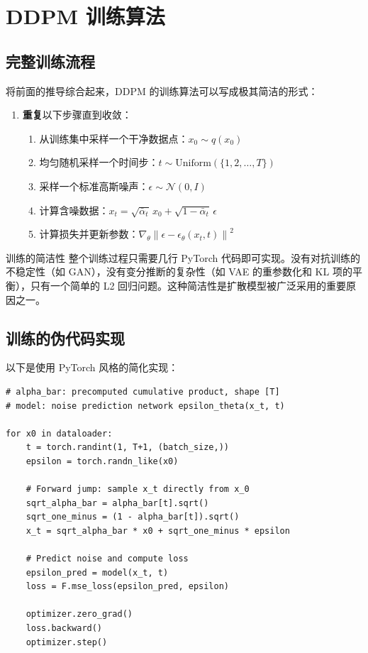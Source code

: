 \section{DDPM 训练算法}

\subsection{完整训练流程}

将前面的推导综合起来，DDPM 的训练算法可以写成极其简洁的形式：

\begin{enumerate}
    \item \textbf{重复}以下步骤直到收敛：
    \begin{enumerate}
        \item 从训练集中采样一个干净数据点：$x_0 \sim q(x_0)$
        \item 均匀随机采样一个时间步：$t \sim \text{Uniform}(\{1, 2, \dots, T\})$
        \item 采样一个标准高斯噪声：$\epsilon \sim \mathcal{N}(0, I)$
        \item 计算含噪数据：$x_t = \sqrt{\bar{\alpha}_t}\, x_0 + \sqrt{1 - \bar{\alpha}_t}\, \epsilon$
        \item 计算损失并更新参数：$\nabla_\theta \left\| \epsilon - \epsilon_\theta(x_t, t) \right\|^2$
    \end{enumerate}
\end{enumerate}

\begin{knowledgebox}{训练的简洁性}
整个训练过程只需要几行 PyTorch 代码即可实现。没有对抗训练的不稳定性（如 GAN），没有变分推断的复杂性（如 VAE 的重参数化和 KL 项的平衡），只有一个简单的 L2 回归问题。这种简洁性是扩散模型被广泛采用的重要原因之一。
\end{knowledgebox}

\subsection{训练的伪代码实现}

以下是使用 PyTorch 风格的简化实现：

\begin{lstlisting}[caption={DDPM 训练的核心循环}, label=lst:train]
# alpha_bar: precomputed cumulative product, shape [T]
# model: noise prediction network epsilon_theta(x_t, t)

for x0 in dataloader:
    t = torch.randint(1, T+1, (batch_size,))
    epsilon = torch.randn_like(x0)

    # Forward jump: sample x_t directly from x_0
    sqrt_alpha_bar = alpha_bar[t].sqrt()
    sqrt_one_minus = (1 - alpha_bar[t]).sqrt()
    x_t = sqrt_alpha_bar * x0 + sqrt_one_minus * epsilon

    # Predict noise and compute loss
    epsilon_pred = model(x_t, t)
    loss = F.mse_loss(epsilon_pred, epsilon)

    optimizer.zero_grad()
    loss.backward()
    optimizer.step()
\end{lstlisting}

